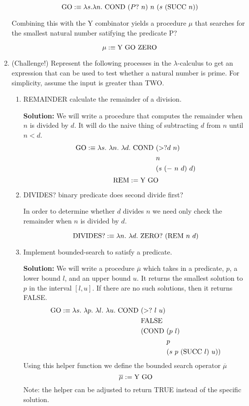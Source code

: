 \documentclass[11pt]{report}
\begin{document}
\begin{enumerate}
	$$\GO :\equiv \lambda s. \lambda n. \ \COND \ (P? \ n) \ n \ (s \ (\SUCC \ n))$$

	Combining this with the Y combinator yields a procedure $\mu$ that searches for the smallest natural number satifying the predicate P?

	$$ \mu :\equiv \YCOMB \ \GO \ \ZERO $$	

	\newpage
	\item (Challenge!) Represent the following processes in the $\lambda$-calculus to get an expression that can be used to test whether a natural number is prime. For simplicity, assume the input is greater than TWO.
	
		\begin{enumerate}
			\item REMAINDER calculate the remainder of a division.
			
			\textbf{Solution:} We will write a procedure that computes the remainder when $n$ is divided by $d$. It will do the naive thing of subtracting $d$ from $n$ until $n<d$.			
			\begin{align*}
				\text{GO} :\equiv \lambda s. \ \lambda n. \ \lambda d. \ \text{COND} \ &(>? d \ n) \\
				&n \\
				&(s \ (- \ n \ d) \ d)			
			\end{align*}			
			$$\text{REM}:= \text{Y} \ \text{GO}$$
			
			\item DIVIDES? binary predicate does second divide first?
			
			In order to determine whether $d$ divides $n$ we need only check the remainder when $n$ is divided by $d$. 
			
			$$\text{DIVIDES?}:\equiv \lambda n. \ \lambda d. \ \ISITZERO \ (\text{REM} \ n \ d)$$
			
			\item Implement bounded-search to satisfy a predicate.
			
			\textbf{Solution:} We will write a procedure $\overline{\mu}$ which takes in a predicate, $p$, a lower bound $l$, and an upper bound $u$. It returns the smallest solution to $p$ in the interval $[l,u]$. If there are no such solutions, then it returns FALSE.			
			\begin{align*}
				\GO :\equiv \lambda s. \ \lambda p. \ \lambda l. \ \lambda u. \ \COND \ &(>? \ l \ u) \\
				& \FALSE \\
				&(\COND \ (p \ l) \\
				&\hspace{12mm} \ p \\
				&\hspace{12mm} \ (s \ p \ (\SUCC \ l) \ u))	
			\end{align*}			
			Using this helper function we define the bounded search operator $\overline{\mu}$
			$$\overline{\mu} := \text{Y} \ \text{GO}$$			
			Note: the helper can be adjusted to return TRUE instead of the specific solution.		


\end{enumerate}
\end{enumerate}
\end{document}
